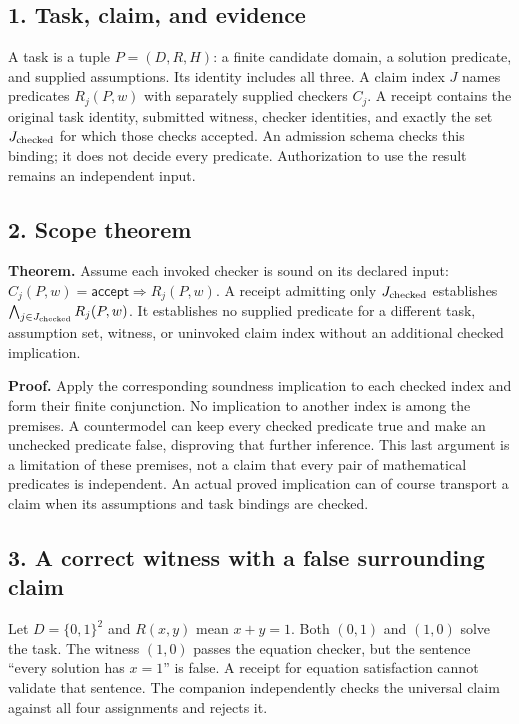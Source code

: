 \documentclass[
  11pt,
]{article}
\begin{document}
\subsection{1. Task, claim, and evidence}\label{task-claim-and-evidence}

A task is a tuple \(P=(D,\allowbreak R,\allowbreak H)\): a finite
candidate domain, a solution predicate, and supplied assumptions. Its
identity includes all three. A claim index \(J\) names predicates
\(R_j(P,\allowbreak w)\) with separately supplied checkers \(C_j\). A
receipt contains the original task identity, submitted witness, checker
identities, and exactly the set \(J_{\rm checked}\) for which those
checks accepted. An admission schema checks this binding; it does not
decide every predicate. Authorization to use the result remains an
independent input.

\subsection{2. Scope theorem}\label{scope-theorem}

\textbf{Theorem.} Assume each invoked checker is sound on its declared
input:
\(C_j(P,\allowbreak w)=\mathsf{accept}\Rightarrow R_j(P,\allowbreak w)\).
A receipt admitting only \(J_{\rm checked}\) establishes
\(\bigwedge_{j\in J_{\rm checked}}R_j(P,\allowbreak w)\). It establishes
no supplied predicate for a different task, assumption set, witness, or
uninvoked claim index without an additional checked implication.

\textbf{Proof.} Apply the corresponding soundness implication to each
checked index and form their finite conjunction. No implication to
another index is among the premises. A countermodel can keep every
checked predicate true and make an unchecked predicate false, disproving
that further inference. This last argument is a limitation of these
premises, not a claim that every pair of mathematical predicates is
independent. An actual proved implication can of course transport a
claim when its assumptions and task bindings are checked.

\subsection{3. A correct witness with a false surrounding
claim}\label{a-correct-witness-with-a-false-surrounding-claim}

Let \(D=\{0,\allowbreak 1\}^2\) and \(R(x,\allowbreak y)\) mean
\(x+y=1\). Both \((0,\allowbreak 1)\) and \((1,\allowbreak 0)\) solve
the task. The witness \((1,\allowbreak 0)\) passes the equation checker,
but the sentence ``every solution has \(x=1\)'' is false. A receipt for
equation satisfaction cannot validate that sentence. The companion
independently checks the universal claim against all four assignments
and rejects it.
\end{document}
